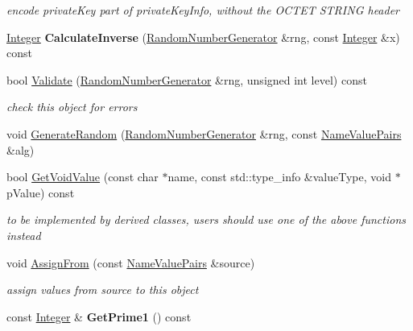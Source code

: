 \begin{DoxyCompactItemize}
\begin{DoxyCompactList}\small\item\em encode privateKey part of privateKeyInfo, without the OCTET STRING header \item\end{DoxyCompactList}\item 
\hypertarget{class_invertible_r_s_a_function_a929a48a3b7942c57223c0ca8baa194d3}{
\hyperlink{class_integer}{Integer} {\bfseries CalculateInverse} (\hyperlink{class_random_number_generator}{RandomNumberGenerator} \&rng, const \hyperlink{class_integer}{Integer} \&x) const }
\label{class_invertible_r_s_a_function_a929a48a3b7942c57223c0ca8baa194d3}

\item 
bool \hyperlink{class_invertible_r_s_a_function_a35247205517f839220a16287917ce0ce}{Validate} (\hyperlink{class_random_number_generator}{RandomNumberGenerator} \&rng, unsigned int level) const 
\begin{DoxyCompactList}\small\item\em check this object for errors \item\end{DoxyCompactList}\item 
void \hyperlink{class_invertible_r_s_a_function_a369c37b8f01c8b64f22baa28811ff72f}{GenerateRandom} (\hyperlink{class_random_number_generator}{RandomNumberGenerator} \&rng, const \hyperlink{class_name_value_pairs}{NameValuePairs} \&alg)
\item 
\hypertarget{class_invertible_r_s_a_function_a5d11463cbb6dac0edea661e6da7ed7ad}{
bool \hyperlink{class_invertible_r_s_a_function_a5d11463cbb6dac0edea661e6da7ed7ad}{GetVoidValue} (const char $\ast$name, const std::type\_\-info \&valueType, void $\ast$pValue) const }
\label{class_invertible_r_s_a_function_a5d11463cbb6dac0edea661e6da7ed7ad}

\begin{DoxyCompactList}\small\item\em to be implemented by derived classes, users should use one of the above functions instead \item\end{DoxyCompactList}\item 
void \hyperlink{class_invertible_r_s_a_function_a871fc366191e9c5fae114c06a200c928}{AssignFrom} (const \hyperlink{class_name_value_pairs}{NameValuePairs} \&source)
\begin{DoxyCompactList}\small\item\em assign values from source to this object \item\end{DoxyCompactList}\item 
\hypertarget{class_invertible_r_s_a_function_a110e90d90147595f78d03edc23067da1}{
const \hyperlink{class_integer}{Integer} \& {\bfseries GetPrime1} () const }
\label{class_invertible_r_s_a_function_a110e90d90147595f78d03edc23067da1}


\end{DoxyCompactItemize}
